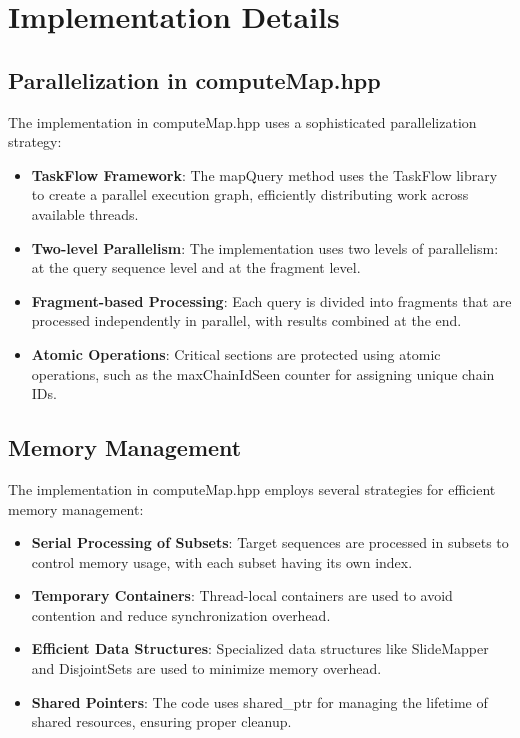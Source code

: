 \documentclass{article}
\begin{document}
\section{Implementation Details}

\subsection{Parallelization in computeMap.hpp}

The implementation in computeMap.hpp uses a sophisticated parallelization strategy:

\begin{itemize}
    \item \textbf{TaskFlow Framework}: The mapQuery method uses the TaskFlow library to create a parallel execution graph, efficiently distributing work across available threads.
    
    \item \textbf{Two-level Parallelism}: The implementation uses two levels of parallelism: at the query sequence level and at the fragment level.
    
    \item \textbf{Fragment-based Processing}: Each query is divided into fragments that are processed independently in parallel, with results combined at the end.
    
    \item \textbf{Atomic Operations}: Critical sections are protected using atomic operations, such as the maxChainIdSeen counter for assigning unique chain IDs.
\end{itemize}

\subsection{Memory Management}

The implementation in computeMap.hpp employs several strategies for efficient memory management:

\begin{itemize}
    \item \textbf{Serial Processing of Subsets}: Target sequences are processed in subsets to control memory usage, with each subset having its own index.
    
    \item \textbf{Temporary Containers}: Thread-local containers are used to avoid contention and reduce synchronization overhead.
    
    \item \textbf{Efficient Data Structures}: Specialized data structures like SlideMapper and DisjointSets are used to minimize memory overhead.
    
    \item \textbf{Shared Pointers}: The code uses shared\_ptr for managing the lifetime of shared resources, ensuring proper cleanup.
\end{itemize}
\end{document}
